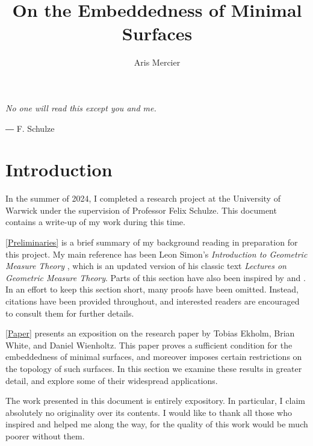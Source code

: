 \documentclass[a4paper, 11pt]{article}
\title{On the Embeddedness of Minimal Surfaces}
\author{Aris Mercier}
\date{}
\theoremstyle{plain}
\theoremstyle{definition}
\theoremstyle{remark}
\numberwithin{equation}{subsection}
\begin{document}
\maketitle
\tableofcontents
\newpage

\epigraph{\emph{No one will read this except you and me.}}{― F. Schulze}
\section{Introduction}

In the summer of 2024, I completed a research project at the University of Warwick under the supervision of Professor Felix Schulze. This document contains a write-up of my work during this time.


\cref{Preliminaries} is a brief summary of my background reading in preparation for this project. My main reference has been Leon Simon's \emph{Introduction to Geometric Measure Theory} \cite{Sim18}, which is an updated version of his classic text \emph{Lectures on Geometric Measure Theory}. Parts of this section have also been inspired by \cite{Rin22} and \cite{Mor16}. In an effort to keep this section short, many proofs have been omitted. Instead, citations have been provided throughout, and interested readers are encouraged to consult them for further details.

\cref{Paper} presents an exposition on the research paper \cite{EWW02} by Tobias Ekholm, Brian White, and Daniel Wienholtz. This paper proves a sufficient condition for the embeddedness of minimal surfaces, and moreover imposes certain restrictions on the topology of such surfaces. In this section we examine these results in greater detail, and explore some of their widespread applications.

The work presented in this document is entirely expository. In particular, I claim absolutely no originality over its contents. I would like to thank all those who inspired and helped me along the way, for the quality of this work would be much poorer without them.

\begin{comment}
In the summer of 2024, I completed a research project at the University of Warwick under the supervision of Professor Felix Schulze. This document contains a write-up of my work during this time.

In particular, we present an exposition on the research paper \cite{EWW02} by Tobias Ekholm, Brian White, and Daniel Wienholtz. This paper proves a sufficient condition for the embeddedness of minimal surfaces, and moreover imposes certain restrictions on the topology of such surfaces. In this section we examine these results in greater detail, and explore some of their widespread applications.

The present document is a shortened version of my full write-up, and was created for the purposes of public engagement. Interested readers can access a far more detailed version \href{https://arismercier.github.io/GMT_Notes/GMT_Notes.pdf}{here}.
\end{comment}
\end{document}
